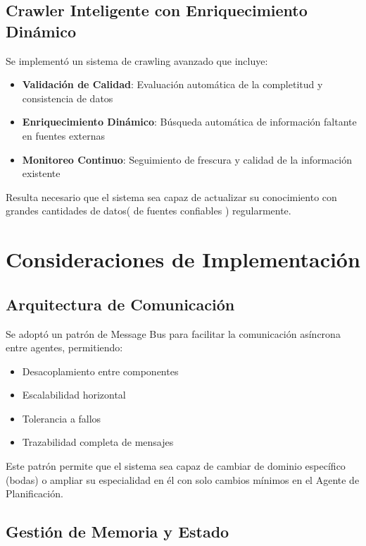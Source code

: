 \documentclass[runningheads,a4paper]{llncs}
\begin{document}
\subsection{Crawler Inteligente con Enriquecimiento Dinámico}

Se implementó un sistema de crawling avanzado que incluye:

\begin{itemize}
    \item \textbf{Validación de Calidad}: Evaluación automática de la completitud y consistencia de datos
    \item \textbf{Enriquecimiento Dinámico}: Búsqueda automática de información faltante en fuentes externas
    \item \textbf{Monitoreo Continuo}: Seguimiento de frescura y calidad de la información existente
\end{itemize}

Resulta necesario que el sistema sea capaz de actualizar su conocimiento con grandes cantidades de datos( de fuentes confiables ) regularmente.

\section{Consideraciones de Implementación}

\subsection{Arquitectura de Comunicación}

Se adoptó un patrón de Message Bus para facilitar la comunicación asíncrona entre agentes, permitiendo:

\begin{itemize}
    \item Desacoplamiento entre componentes
    \item Escalabilidad horizontal
    \item Tolerancia a fallos
    \item Trazabilidad completa de mensajes
\end{itemize}

Este patrón permite que el sistema sea capaz de cambiar de dominio específico (bodas) o ampliar su especialidad en él con solo cambios mínimos en el Agente de Planificación.

\subsection{Gestión de Memoria y Estado}
\end{document}
